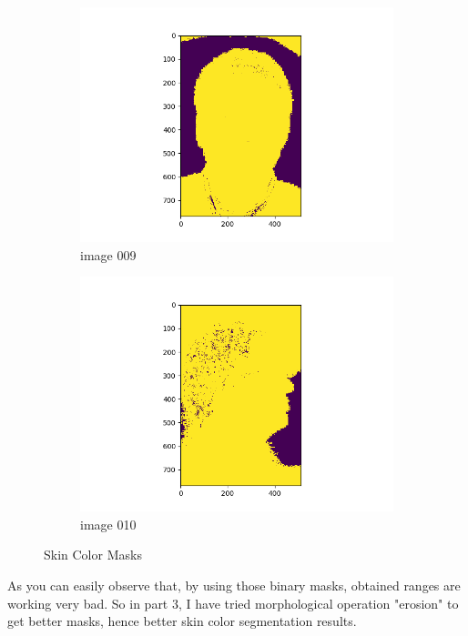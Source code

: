 \documentclass[11pt]{report}
\begin{document}
\begin{figure}[H]
\begin{subfigure}{0.3\textwidth}
        \includegraphics[width=\textwidth]{Task 2 Plots/skin_color_mask_009.png}
        \caption{image 009}
        \label{fig:skin_colormask9}
    \end{subfigure}
    \begin{subfigure}{0.3\textwidth}
        \centering
        \includegraphics[width=\textwidth]{Task 2 Plots/skin_color_mask_010.png}
        \caption{image 010}
        \label{fig:skin_colormask10}
    \end{subfigure}
    \caption{Skin Color Masks}
    \label{fig:skincolormasksall}
\end{figure}

\newpage

As you can easily observe that, by using those binary masks, obtained ranges are working very bad. So in part 3, I have tried morphological operation "erosion" to get better masks, hence better skin color segmentation results.
\end{document}
